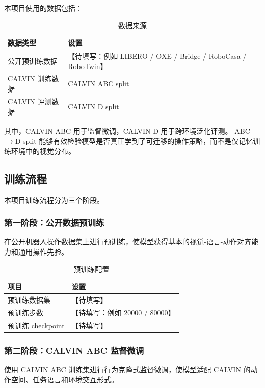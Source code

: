 \documentclass[10pt,a4paper,fontset=none]{ctexart}
\newcommand{\todo}[1]{\textcolor{TodoRed}{【#1】}}
\newcommand{\PretrainSteps}{\todo{待填写：例如 20000 / 80000}}
\begin{document}
本项目使用的数据包括：

\begin{table}[H]
\centering
\caption{数据来源}
\begin{tabularx}{0.92\textwidth}{lX}
\toprule
数据类型 & 设置 \\
\midrule
公开预训练数据 & \todo{待填写：例如 LIBERO / OXE / Bridge / RoboCasa / RoboTwin} \\
CALVIN 训练数据 & CALVIN ABC split \\
CALVIN 评测数据 & CALVIN D split \\
\bottomrule
\end{tabularx}
\end{table}

其中，CALVIN ABC 用于监督微调，CALVIN D 用于跨环境泛化评测。
ABC$\rightarrow$D split 能够有效检验模型是否真正学到了可迁移的操作策略，而不是仅记忆训练环境中的视觉分布。

\subsection{训练流程}

本项目训练流程分为三个阶段。

\subsubsection{第一阶段：公开数据预训练}

在公开机器人操作数据集上进行预训练，使模型获得基本的视觉-语言-动作对齐能力和通用操作先验。

\begin{table}[H]
\centering
\caption{预训练配置}
\begin{tabularx}{0.92\textwidth}{lX}
\toprule
项目 & 设置 \\
\midrule
预训练数据集 & \todo{待填写} \\
预训练步数 & \PretrainSteps{} \\
预训练 checkpoint & \todo{待填写} \\
\bottomrule
\end{tabularx}
\end{table}

\subsubsection{第二阶段：CALVIN ABC 监督微调}

使用 CALVIN ABC 训练集进行行为克隆式监督微调，使模型适配 CALVIN 的动作空间、任务语言和环境交互形式。
\end{document}
